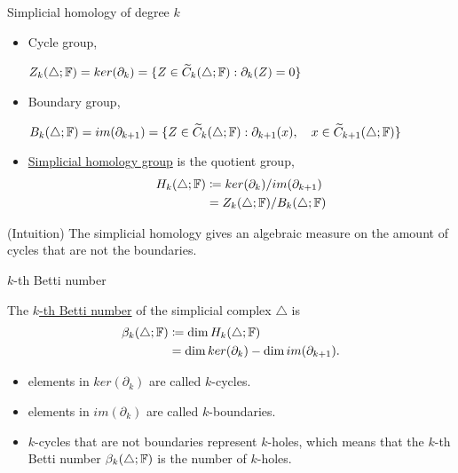 \documentclass[xcolor={dvipsnames,svgnames}]{beamer}
\begin{document}
\begin{frame}{Simplicial homology of degree $k$}
    \begin{defn}
\label{kth-homology-group}
    \begin{itemize}
        \item Cycle group, 
        
        $Z_k(\triangle; \mathbb{F}) = ker(\partial_k) = \{Z \in \widetilde{C}_k(\triangle; \mathbb{F}): \partial_k(Z) = 0\}$ 
        \item Boundary group, 
        
        $B_k(\triangle;\mathbb{F}) = im(\partial_{k+1}) = \{Z \in \widetilde{C}_k(\triangle; \mathbb{F}): \partial_{k+1}(x), \quad x \in \widetilde{C}_{k+1}(\triangle; \mathbb{F})\}$ 
        \item \underline{Simplicial homology group} is the quotient group,
        \begin{align}
        H_k(\triangle;\mathbb{F}) &\coloneqq ker(\partial_k) / im(\partial_{k+1})\\
        &= Z_k(\triangle;\mathbb{F}) / B_k(\triangle;\mathbb{F})
        \end{align}
    \end{itemize}
\end{defn}
    (Intuition) The simplicial homology gives an algebraic measure on the amount of cycles that are not the boundaries. 
\end{frame}

\begin{frame}{$k$-th Betti number}
    \begin{defn}
\label{kth-betti}
    The \underline{$k$-th Betti number} of the simplicial complex $\triangle$ is
    \begin{align}
        \beta_k(\triangle;\mathbb{F}) &\coloneqq \dim H_k(\triangle;\mathbb{F}) \\
        &= \dim ker(\partial_k) - \dim im(\partial_{k + 1}).
    \end{align}
    
    \begin{itemize}
        \item elements in $ker(\partial_k)$ are called $k$-cycles.
        \item elements in $im(\partial_k)$ are called $k$-boundaries.
        \item $k$-cycles that are not boundaries represent $k$-holes, which means that the $k$-th Betti number $\beta_k(\triangle; \mathbb{F})$ is the number of $k$-holes. 
    \end{itemize}
\end{defn} 
\end{frame}
\end{document}

